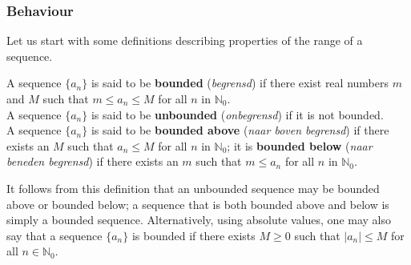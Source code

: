 \subsubsection{Behaviour}
Let us start with some definitions describing properties of the range of a sequence.

\begin{definition}\label{def:bounded}
A sequence $\{a_n\}$ is said to be \textbf{bounded} (\textit{begrensd}) if there exist real numbers $m$ and $M$ such that $m \leq a_n \leq M$ for all $n$ in $\mathbb{N}_0$.\\
A sequence $\{a_n\}$ is said to be \textbf{unbounded} (\textit{onbegrensd}) if it is not bounded.\\
A sequence $\{a_n\}$ is said to be \textbf{bounded above} (\textit{naar boven begrensd}) if there exists an $M$ such that $a_n \leq  M$ for all $n$ in $\mathbb{N}_0$; it is \textbf{bounded below} (\textit{naar beneden begrensd}) if there exists an $m$ such that $m\leq a_n$ for all $n$ in $\mathbb{N}_0$.
\end{definition}

It follows from this definition that an unbounded sequence may be bounded above or bounded below; a sequence that is both bounded above and below is simply a bounded sequence. Alternatively, using absolute values, one may also say that a sequence $\{a_n\}$ is bounded if there exists $M\geq0$ such that $\left|a_n\right|\leq M$ for all $n\in\mathbb{N}_0$. 


